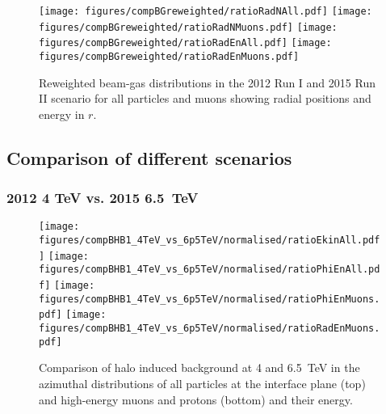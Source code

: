 \begin{figure}%
\centering
\texttt{[image: figures/compBGreweighted/ratioRadNAll.pdf]}
\texttt{[image: figures/compBGreweighted/ratioRadNMuons.pdf]}
\texttt{[image: figures/compBGreweighted/ratioRadEnAll.pdf]}
\texttt{[image: figures/compBGreweighted/ratioRadEnMuons.pdf]}
\caption{Reweighted beam-gas distributions in the 2012 Run I and 2015 Run II scenario for all particles and muons showing radial positions and energy in $r$.
  \label{fig:compBGreweighted2}}
\end{figure}






\subsection{Comparison of different scenarios \label{compRun1Run2}}




\subsubsection{2012 4 TeV vs. 2015 6.5~TeV}
\begin{figure}
\begin{center}
  \texttt{[image: figures/compBHB1\_4TeV\_vs\_6p5TeV/normalised/ratioEkinAll.pdf]}
  \texttt{[image: figures/compBHB1\_4TeV\_vs\_6p5TeV/normalised/ratioPhiEnAll.pdf]}
  \texttt{[image: figures/compBHB1\_4TeV\_vs\_6p5TeV/normalised/ratioPhiEnMuons.pdf]}
  \texttt{[image: figures/compBHB1\_4TeV\_vs\_6p5TeV/normalised/ratioRadEnMuons.pdf]}
\end{center}
\vspace{-0.6cm}
 \caption{Comparison of halo induced background at 4 and 6.5~TeV in the azimuthal distributions of all particles at the interface plane (top) and high-energy muons and protons (bottom) and their energy.
  \label{compBHB1run1run2}}
\end{figure}

